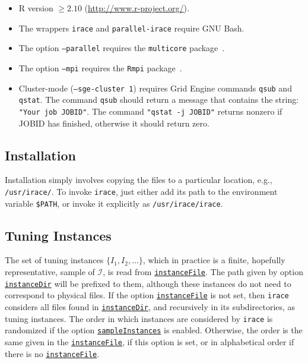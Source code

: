 \documentclass[a4paper]{article}
\newcommand{\irace}{\texttt{irace}\xspace}
\newcommand{\aR}{\textsf{R}\xspace}
\newcommand{\parameter}[1]{\hyperlink{opt:#1}{\texttt{#1}}}
\begin{document}
\begin{itemize}
\item \aR version $\geq 2.10$ (\url{http://www.r-project.org/}).
\item The wrappers \texttt{irace} and \texttt{parallel-irace} require GNU Bash.
\item The option \texttt{--parallel} requires the \texttt{multicore} package~\citep{R:multicore}.
\item The option \texttt{--mpi} requires the \texttt{Rmpi} package~\cite{R:Rmpi}.

\item Cluster-mode (\texttt{--sge-cluster 1}) requires Grid Engine
  commands \texttt{qsub} and \texttt{qstat}. The command \texttt{qsub}
  should return a message that contains the string: \texttt{"Your job
    JOBID"}. The command \texttt{"qstat -j JOBID"} returns nonzero if
  JOBID has finished, otherwise it should return zero.
\end{itemize}


\subsection{Installation}

Installation simply involves copying the files to a particular
location, e.g., \texttt{/usr/irace/}. To invoke \irace, just either
add its path to the environment variable \verb|$PATH|, or invoke it
explicitly as \texttt{/usr/irace/irace}.




\subsection{Tuning Instances}\label{sec:instances}

The set of tuning instances $\{I_1, I_2, \dotsc\}$, which in
practice is a finite, hopefully representative, sample of
$\mathcal{I}$, is read from \parameter{instanceFile}. The path given
by option \parameter{instanceDir} will be prefixed to them, although
these instances do not need to correspond to physical files. If the
option \parameter{instanceFile} is not set, then \irace considers all
files found in \parameter{instanceDir}, and recursively in its
subdirectories, as tuning instances. The order in which instances
are considered by \irace is randomized if the
option \parameter{sampleInstances} is enabled. Otherwise, the order is
the same given in the \parameter{instanceFile}, if this option is set,
or in alphabetical order if there is no \parameter{instanceFile}.
\end{document}
